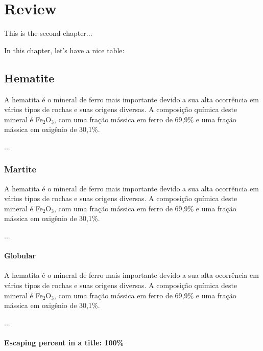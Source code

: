 
\chapter{Review}

This is the second chapter...

In this chapter, let's have a nice table:

%


\section{Hematite}

A hematita é o mineral de ferro mais importante devido a sua alta
ocorrência em vários tipos de rochas e suas origens diversas.\cite{30}
A composição química deste mineral é Fe$_{2}$O$_{3}$, com uma fração
mássica em ferro de 69,9\% e uma fração mássica em oxigênio de
30,1\%.\cite{31}

...


\subsection{Martite}

A hematita é o mineral de ferro mais importante devido a sua alta
ocorrência em vários tipos de rochas e suas origens diversas.\cite{30}
A composição química deste mineral é Fe$_{2}$O$_{3}$, com uma fração
mássica em ferro de 69,9\% e uma fração mássica em oxigênio de
30,1\%.\cite{31}

...


\subsubsection{Globular}

A hematita é o mineral de ferro mais importante devido a sua alta
ocorrência em vários tipos de rochas e suas origens diversas.\cite{30}
A composição química deste mineral é Fe$_{2}$O$_{3}$, com uma fração
mássica em ferro de 69,9\% e uma fração mássica em oxigênio de
30,1\%.\cite{31}

...

\subsubsection{Escaping percent in a title:  100\%}
